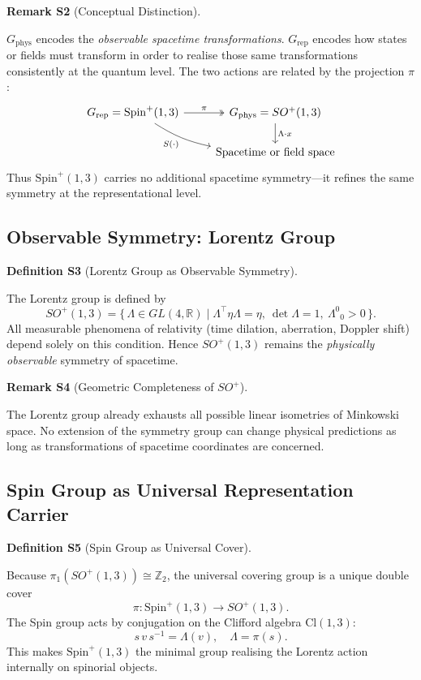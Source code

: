 \documentclass[10pt, letterpaper]{article}
\newcommand{\R}{\mathbb{R}}
\newcommand{\Z}{\mathbb{Z}}
\newcommand{\Cl}{\mathrm{Cl}}
\newcommand{\Spin}{\mathrm{Spin}}
\newcommand{\CustomHeading}[3]{%
  \par\medskip\noindent%
  \textbf{#1 #2} \textnormal{(#3)}.\enskip%
}
\newenvironment{DEF}[2]{\begin{unitbox}\CustomHeading{Definition}{#1}{#2}}{\end{unitbox}}
\newenvironment{REM}[2]{\begin{unitbox}\CustomHeading{Remark}{#1}{#2}}{\end{unitbox}}
\begin{document}
\begin{REM}{S2}{Conceptual Distinction}
$G_{\mathrm{phys}}$ encodes the \emph{observable spacetime transformations}.  
$G_{\mathrm{rep}}$ encodes how states or fields must transform in order to realise those same transformations consistently at the quantum level.  
The two actions are related by the projection $\pi$:
\[
\begin{tikzcd}
G_{\mathrm{rep}}=\Spin^+(1,3) \arrow[r, "\pi", two heads] \arrow[dr, bend right=10, "S(\cdot)"']
& G_{\mathrm{phys}}=SO^+(1,3) \arrow[d, "\Lambda\cdot x"] \\
& \text{Spacetime or field space}
\end{tikzcd}
\]
Thus $\Spin^+(1,3)$ carries no additional spacetime symmetry—it refines the same symmetry at the representational level.
\end{REM}

\subsection{Observable Symmetry: Lorentz Group}

\begin{DEF}{S3}{Lorentz Group as Observable Symmetry}
The Lorentz group is defined by
\[
SO^+(1,3) = \{\,\Lambda\in GL(4,\R) \mid \Lambda^\top \eta \Lambda = \eta,\ \det\Lambda=1,\ \Lambda^0{}_0>0\,\}.
\]
All measurable phenomena of relativity (time dilation, aberration, Doppler shift) depend solely on this condition.  
Hence $SO^+(1,3)$ remains the \emph{physically observable} symmetry of spacetime.
\end{DEF}

\begin{REM}{S4}{Geometric Completeness of $SO^+$}
The Lorentz group already exhausts all possible linear isometries of Minkowski space.  
No extension of the symmetry group can change physical predictions as long as transformations of spacetime coordinates are concerned.
\end{REM}

\subsection{Spin Group as Universal Representation Carrier}

\begin{DEF}{S5}{Spin Group as Universal Cover}
Because $\pi_1(SO^+(1,3))\cong\Z_2$, the universal covering group is a unique double cover
\[
\pi:\Spin^+(1,3)\to SO^+(1,3).
\]
The Spin group acts by conjugation on the Clifford algebra $\Cl(1,3)$:
\[
s\,v\,s^{-1} = \Lambda(v),\quad \Lambda=\pi(s).
\]
This makes $\Spin^+(1,3)$ the minimal group realising the Lorentz action internally on spinorial objects.
\end{DEF}
\end{document}
